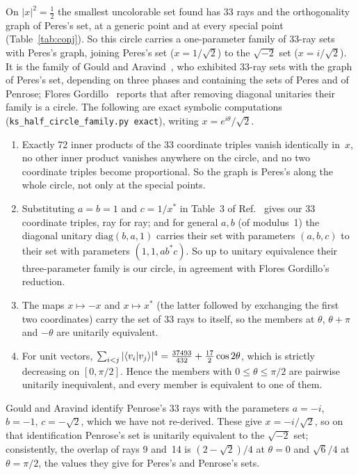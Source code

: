 On $|x|^2=\tfrac12$ the smallest uncolorable set found has 33 rays and the orthogonality graph
of Peres's set, at a generic point and at every special point (Table~\ref{tab:conj}).  So this
circle carries a one-parameter family of 33-ray sets with Peres's graph, joining Peres's set
($x=1/\sqrt2$) to the $\sqrt{-2}$ set ($x=i/\sqrt2$).  It is the family of Gould and
Aravind~\cite{GouldAravind2010}, who exhibited 33-ray sets with the graph of Peres's set,
depending on three phases and containing the sets of Peres and of Penrose; Flores
Gordillo~\cite{FloresGordillo2026} reports that after removing diagonal unitaries their family
is a circle.  The following are exact symbolic computations
(\texttt{ks\_half\_circle\_family.py exact}), writing $x=e^{i\theta}/\sqrt2$.
\begin{enumerate}[label=(\alph*)]
\item Exactly 72 inner products of the 33 coordinate triples vanish identically in~$x$, no other inner
product vanishes anywhere on the circle, and no two coordinate triples become proportional.  So the graph is
Peres's along the whole circle, not only at the special points.
\item Substituting $a=b=1$ and $c=1/x^{*}$ in Table~3 of Ref.~\cite{GouldAravind2010} gives our
33 coordinate triples, ray for ray; and for general $a,b$ (of modulus~1) the diagonal unitary
$\mathrm{diag}(b,a,1)$ carries their set with parameters $(a,b,c)$ to their set with parameters
$(1,1,ab^{*}c)$.  So up to unitary equivalence their three-parameter family is our circle, in
agreement with Flores Gordillo's reduction.
\item The maps $x\mapsto-x$ and $x\mapsto x^{*}$ (the latter followed by exchanging the first
two coordinates) carry the set of 33 rays to itself, so the members at $\theta$, $\theta+\pi$
and $-\theta$ are unitarily equivalent.
\item For unit vectors, $\sum_{i<j}|\langle v_i|v_j\rangle|^4=
\tfrac{37493}{432}+\tfrac{17}{2}\cos2\theta$, which is strictly decreasing on $[0,\pi/2]$.
Hence the members with $0\le\theta\le\pi/2$ are pairwise unitarily inequivalent, and every
member is equivalent to one of them.
\end{enumerate}
Gould and Aravind identify Penrose's 33 rays with the parameters
$a=-i$, $b=-1$, $c=-\sqrt2$, which we have not re-derived.  These give $x=-i/\sqrt2$, so on that
identification Penrose's set is unitarily equivalent to the $\sqrt{-2}$ set; consistently, the
overlap of rays 9 and~14 is $(2-\sqrt2)/4$ at $\theta=0$ and $\sqrt6/4$ at $\theta=\pi/2$, the
values they give for Peres's and Penrose's sets.

